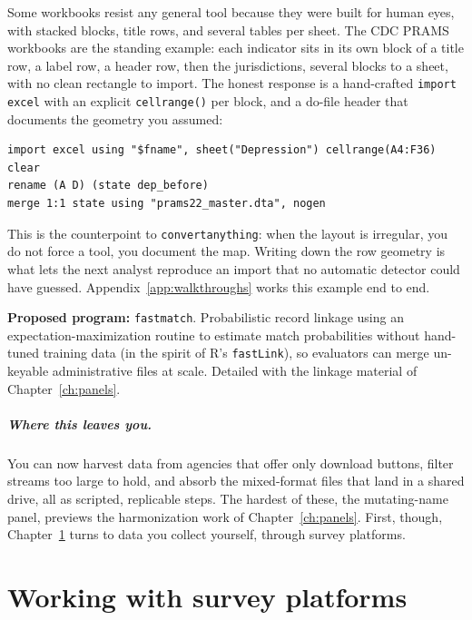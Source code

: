 \documentclass[
    a4paper,
    fontsize=10pt,
    twoside=true,
    numbers=noenddot,
]{kaobook}
\begin{document}
Some workbooks resist any general tool because they were built for human eyes, with stacked blocks, title rows, and several tables per sheet. The CDC PRAMS workbooks are the standing example: each indicator sits in its own block of a title row, a label row, a header row, then the jurisdictions, several blocks to a sheet, with no clean rectangle to import. The honest response is a hand-crafted \texttt{import excel} with an explicit \texttt{cellrange()} per block, and a do-file header that documents the geometry you assumed:
{\footnotesize
\begin{verbatim}
import excel using "$fname", sheet("Depression") cellrange(A4:F36) clear
rename (A D) (state dep_before)
merge 1:1 state using "prams22_master.dta", nogen
\end{verbatim}
}
This is the counterpoint to \texttt{convertanything}: when the layout is irregular, you do not force a tool, you document the map. Writing down the row geometry is what lets the next analyst reproduce an import that no automatic detector could have guessed. Appendix~\ref{app:walkthroughs} works this example end to end.

\begin{kaobox}[frametitle=Ado-file Idea: \texttt{fastmatch}]
\textbf{Proposed program:} \texttt{fastmatch}. Probabilistic record linkage using an expectation-maximization routine to estimate match probabilities without hand-tuned training data (in the spirit of R's \texttt{fastLink}), so evaluators can merge un-keyable administrative files at scale. Detailed with the linkage material of Chapter~\ref{ch:panels}.
\end{kaobox}

\paragraph{Where this leaves you.} You can now harvest data from agencies that offer only download buttons, filter streams too large to hold, and absorb the mixed-format files that land in a shared drive, all as scripted, replicable steps. The hardest of these, the mutating-name panel, previews the harmonization work of Chapter~\ref{ch:panels}. First, though, Chapter~\ref{ch:surveys} turns to data you collect yourself, through survey platforms.

\chapter{Working with survey platforms}\label{ch:surveys}
\end{document}
